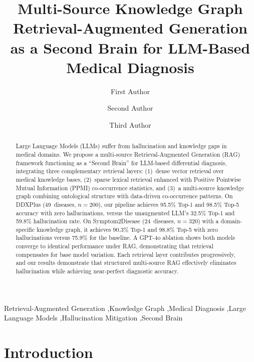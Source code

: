 \documentclass[preprint,12pt]{elsarticle}
\begin{document}
\begin{frontmatter}

\title{Multi-Source Knowledge Graph Retrieval-Augmented Generation\\as a Second Brain for LLM-Based Medical Diagnosis}

\author[addr1]{First Author}
\author[addr1]{Second Author}
\author[addr1]{Third Author}

\address[addr1]{Department of Computer Science, University, Country}

\begin{abstract}
Large Language Models (LLMs) suffer from hallucination and knowledge gaps in medical domains. We propose a multi-source Retrieval-Augmented Generation (RAG) framework functioning as a ``Second Brain'' for LLM-based differential diagnosis, integrating three complementary retrieval layers: (1)~dense vector retrieval over medical knowledge bases, (2)~sparse lexical retrieval enhanced with Positive Pointwise Mutual Information (PPMI) co-occurrence statistics, and (3)~a multi-source knowledge graph combining ontological structure with data-driven co-occurrence patterns. On DDXPlus (49~diseases, $n{=}200$), our pipeline achieves 95.5\% Top-1 and 98.5\% Top-5 accuracy with zero hallucinations, versus the unaugmented LLM's 32.5\% Top-1 and 59.8\% hallucination rate. On Symptom2Disease (24~diseases, $n{=}320$) with a domain-specific knowledge graph, it achieves 90.3\% Top-1 and 98.8\% Top-5 with zero hallucinations versus 75.9\% for the baseline. A GPT-4o ablation shows both models converge to identical performance under RAG, demonstrating that retrieval compensates for base model variation. Each retrieval layer contributes progressively, and our results demonstrate that structured multi-source RAG effectively eliminates hallucination while achieving near-perfect diagnostic accuracy.
\end{abstract}

\begin{keyword}
Retrieval-Augmented Generation \sep Knowledge Graph \sep Medical Diagnosis \sep Large Language Models \sep Hallucination Mitigation \sep Second Brain
\end{keyword}

\end{frontmatter}

\section{Introduction}
\label{sec:introduction}
\end{document}
